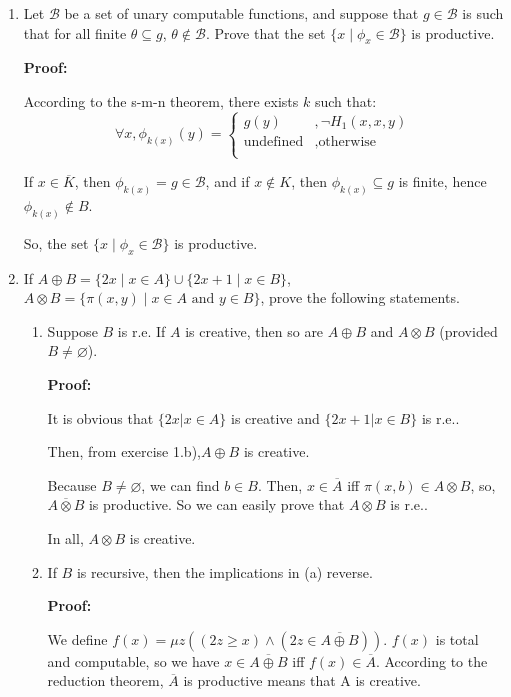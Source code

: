 \documentclass[12pt,a4paper]{article}
\theoremstyle{definition}
\numberwithin{equation}{section}
\numberwithin{figure}{section}
\begin{document}
\begin{enumerate}
\begin{enumerate}
\end{enumerate}

\item Let $\mathscr{B}$ be a set of unary computable functions, and suppose that $g\in\mathscr{B}$ is such that for all finite $\theta\subseteq g$, $\theta\notin\mathscr{B}$. Prove that the set $\{x \mid \phi_x\in\mathscr{B}\}$ is productive. 


\textbf{Proof:}

According to the s-m-n theorem, there exists $k$ such that:
 $$\forall x, \phi_{k(x)}(y) = \begin{cases} g(y) &,  \neg H_1(x,x,y) \\
 \mbox{undefined} &, \mbox{otherwise} \\
 \end{cases}$$


If $x \in \overline{K}$, then $\phi_{k(x)} = g \in \mathscr{B}$, and if $x \notin K$, then $\phi_{k(x)} \subseteq g$ is finite, hence $\phi_{k(x)} \notin B$. 

So, the set $\{x \mid \phi_x\in\mathscr{B}\}$ is productive.

\item If $A\oplus B=\{2x \mid x\in A\}\cup\{2x+1 \mid x\in B\}$, $A\otimes B=\{\pi (x,y) \mid x\in A \mbox{ and } y\in B\}$, prove the following statements.

\begin{enumerate}
  \item Suppose $B$ is r.e. If $A$ is creative, then so are $A\oplus B$ and $A\otimes B$ (provided $B\neq\varnothing$).
  
  \textbf{Proof:}
  
  It is obvious that $\{2x | x \in A\}$ is creative and $\{2x+1 | x \in B\}$ is r.e..
  
  Then, from exercise 1.b),$A \oplus B$ is creative.
  
Because $B \neq \varnothing$, we can find $b \in B$. Then, $x \in \overline{A}$ iff $\pi(x,b) \in A \otimes B$, so, $\overline{A \otimes B}$ is productive. So we can easily prove that $A \otimes B$ is r.e..
   
In all, $A \otimes B$ is creative.
  
  \item If $B$ is recursive, then the implications in (a) reverse.
  
    \textbf{Proof:}
  
  We define $f(x) = \mu z((2z \geq x) \wedge (2z \in \overline{A \oplus B}))$. $f(x)$ is total and computable, so we have $x \in \overline{A \oplus B}$ iff $f(x) \in \overline{A}$. According to the reduction theorem, $\overline{A}$ is productive means that A is creative.
  

\end{enumerate}
\end{enumerate}
\end{document}

